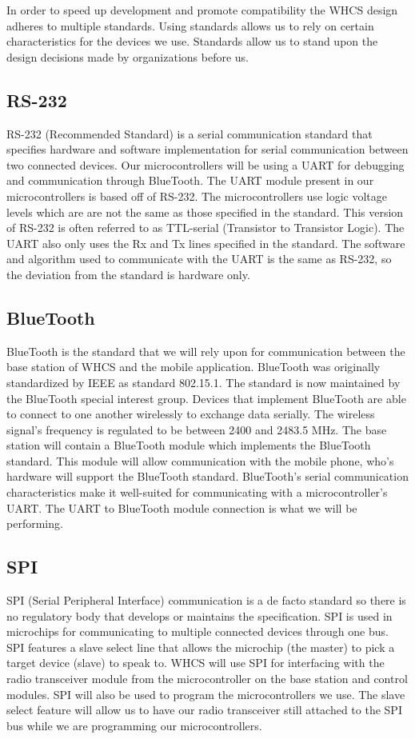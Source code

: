 In order to speed up development and promote compatibility the WHCS design
adheres to multiple standards. Using standards allows us to rely on certain
characteristics for the devices we use. Standards allow us to stand upon the
design decisions made by organizations before us.

\subsection{RS{}-232}
RS{}-232 (Recommended Standard) is a serial communication standard that
specifies hardware and software implementation for serial communication between
two connected devices. Our microcontrollers will be using a UART for debugging
and communication through BlueTooth. The UART module present in our
microcontrollers is based off of RS{}-232. The microcontrollers use logic
voltage levels which are are not the same as those specified in the standard.
This version of RS{}-232 is often referred to as TTL{}-serial (Transistor to
Transistor Logic). The UART also only uses the Rx and Tx lines specified in the
standard. The software and algorithm used to communicate with the UART is the
same as RS{}-232, so the deviation from the standard is hardware only.

\subsection{BlueTooth}
BlueTooth is the standard that we will rely upon for
communication between the base station of WHCS and the mobile application.
BlueTooth was originally standardized by IEEE as standard 802.15.1. The
standard is now maintained by the BlueTooth special interest group. Devices
that implement BlueTooth are able to connect to one another wirelessly to
exchange data serially. The wireless signal{}'s frequency is regulated to be
between 2400 and 2483.5 MHz. The base station will contain a BlueTooth module
which implements the BlueTooth standard. This module will allow communication
with the mobile phone, who{}'s hardware will support the BlueTooth standard.
BlueTooth{}'s serial communication characteristics make it well{}-suited for
communicating with a microcontroller{}'s UART. The UART to BlueTooth module
connection is what we will be performing.

\subsection{SPI}
SPI (Serial Peripheral Interface) communication is a de facto
standard so there is no regulatory body that develops or maintains the
specification. SPI is used in microchips for communicating to multiple
connected devices through one bus.  SPI features a slave select line that
allows the microchip (the master) to pick a target device (slave) to speak to.
WHCS will use SPI for interfacing with the radio transceiver module from the
microcontroller on the base station and control modules. SPI will also be used
to program the microcontrollers we use. The slave select feature will allow us
to have our radio transceiver still attached to the SPI bus while we are
programming our microcontrollers.

